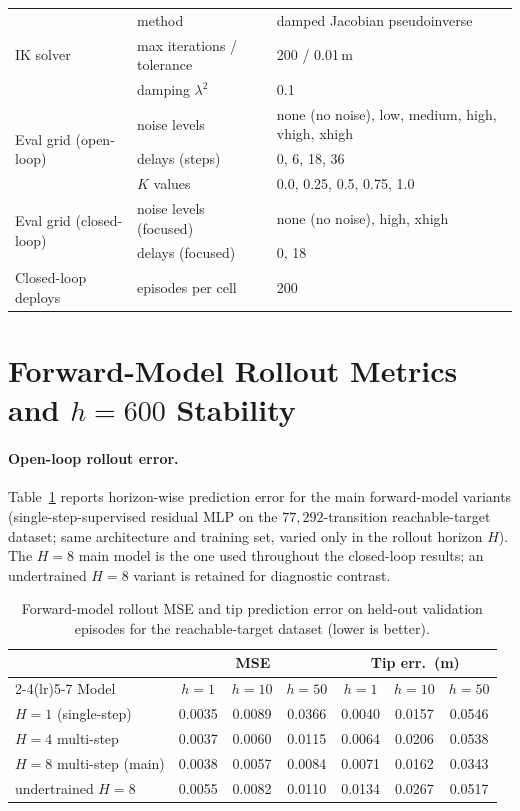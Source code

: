 \documentclass[sn-mathphys,NameDate,iicol]{sn-jnl}
\begin{document}
\begin{appendices}
\begin{table}[!htbp]
\begin{tabular}{@{}lll@{}}
\midrule
\multirow{3}{*}{IK solver}
 & method & damped Jacobian pseudoinverse \\
 & max iterations / tolerance & 200 / 0.01\,m \\
 & damping $\lambda^2$ & 0.1 \\
\midrule
\multirow{3}{*}{Eval grid (open-loop)}
 & noise levels & none (no noise), low, medium, high, vhigh, xhigh \\
 & delays (steps) & 0, 6, 18, 36 \\
 & $K$ values & 0.0, 0.25, 0.5, 0.75, 1.0 \\
\midrule
\multirow{2}{*}{Eval grid (closed-loop)}
 & noise levels (focused) & none (no noise), high, xhigh \\
 & delays (focused) & 0, 18 \\
\midrule
Closed-loop deploys
 & episodes per cell & 200 \\
\bottomrule
\end{tabular}
\end{table}

\section{Forward-Model Rollout Metrics and $h{=}600$ Stability}
\label{app:fwd-rollout}

\paragraph{Open-loop rollout error.}
Table~\ref{tab:fwd_rollout} reports horizon-wise prediction error for
the main forward-model variants (single-step-supervised residual MLP on
the $77{,}292$-transition reachable-target dataset; same architecture
and training set, varied only in the rollout horizon $H$). The
$H{=}8$ main model is the one used throughout the closed-loop
results; an undertrained $H{=}8$ variant is retained for diagnostic
contrast.

\begin{table}[!htbp]
\centering
\caption{Forward-model rollout MSE and tip prediction error on
held-out validation episodes for the reachable-target dataset (lower is better).}
\label{tab:fwd_rollout}
\setlength{\tabcolsep}{4pt}
\footnotesize
\begin{tabular}{@{}l ccc ccc@{}}
\toprule
& \multicolumn{3}{c}{MSE} & \multicolumn{3}{c}{Tip err.\ (m)} \\
\cmidrule(lr){2-4}\cmidrule(lr){5-7}
Model & $h{=}1$ & $h{=}10$ & $h{=}50$ & $h{=}1$ & $h{=}10$ & $h{=}50$ \\
\midrule
$H{=}1$ (single-step) & 0.0035 & 0.0089 & 0.0366 & 0.0040 & 0.0157 & 0.0546 \\
$H{=}4$ multi-step & 0.0037 & 0.0060 & 0.0115 & 0.0064 & 0.0206 & 0.0538 \\
$H{=}8$ multi-step (main) & 0.0038 & 0.0057 & 0.0084 & 0.0071 & 0.0162 & 0.0343 \\
undertrained $H{=}8$ & 0.0055 & 0.0082 & 0.0110 & 0.0134 & 0.0267 & 0.0517 \\
\bottomrule
\end{tabular}
\end{table}


\end{appendices}
\end{document}
